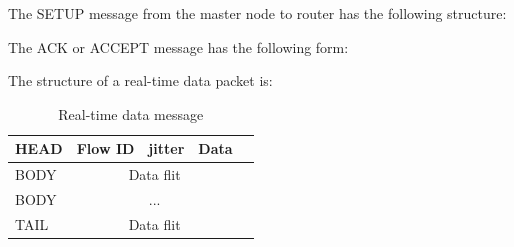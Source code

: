 \documentclass[conference, twocolumn]{IEEEtran}
\theoremstyle{definition}
\begin{document}
The SETUP message from the master node to router has the following structure:

\begin{table}[htbp]
\begin{center}
\end{center}
\caption{SETUP path message}
\label{table:PathMsg}
\end{table}

The ACK or ACCEPT message has the following form:


\begin{table}[htbp]
\begin{center}
\end{center}
\caption{SETUP path message}
\label{table:PathMsg}
\end{table}


The structure of a real-time data packet is:

\begin{table}[htbp]
\begin{center}{
  \begin{tabular}{ | l | l | l | l | l |}
    \hline
	HEAD & Flow ID & jitter & Data \\ \hline 
	BODY & \multicolumn{3}{|c|}{Data flit} \\ \hline
	BODY &\multicolumn{3}{|c|}{...} \\ \hline
	TAIL & \multicolumn{3}{|c|}{Data flit} \\
    \hline
  \end{tabular}
}
\end{center}
\caption{Real-time data message}
\label{table:DataMsg}
\end{table}

\end{document}
